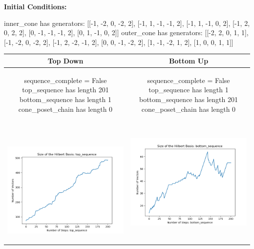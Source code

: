 \documentclass[10pt]{article}
\begin{document}
\textbf{Initial Conditions:}
\begin{SAGE}
inner_cone has generators: 
[[-1, -2, 0, -2, 2], [-1, 1, -1, -1, 2], [-1, 1, -1, 0, 2], [-1, 2, 0, 2, 2], [0, -1, -1, -1, 2], [0, 1, -1, 0, 2]]
outer_cone has generators: 
[[-2, 2, 0, 1, 1], [-1, -2, 0, -2, 2], [-1, 2, -2, -1, 2], [0, 0, -1, -2, 2], [1, -1, -2, 1, 2], [1, 0, 0, 1, 1]]

\end{SAGE}
\begin{tabular}{c|c}
\textbf{Top Down} & \textbf{Bottom Up} \\ \hline  
\begin{SAGE}
	sequence_complete = False
	top_sequence has length 201
	bottom_sequence has length 1
	cone_poset_chain has length 0
\end{SAGE} 
&
\begin{SAGE}
	sequence_complete = False
	top_sequence has length 1
	bottom_sequence has length 201
	cone_poset_chain has length 0
\end{SAGE} 
\\ \hline
\
\begin{minipage}{.45\textwidth}
\includegraphics[width=\textwidth]{"DATA/5d/6 generators 2 bound E/top_sequence SIZE"}
\end{minipage} &
\begin{minipage}{.45\textwidth}
\includegraphics[width=\textwidth]{"DATA/5d/6 generators 2 bound E bottomup/bottom_sequence SIZE"}

\end{minipage}
\end{tabular}
\end{document}
